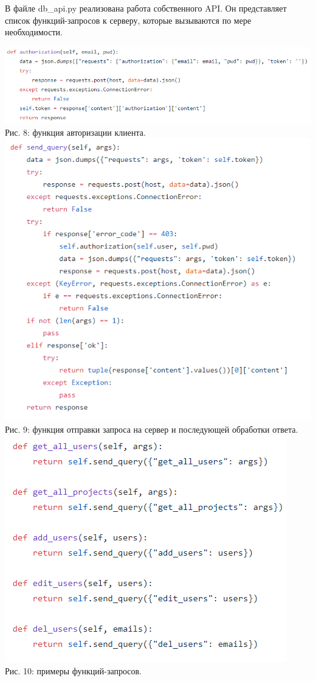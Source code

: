 \documentclass[14pt, a4paper]{extarticle}
\begin{document}
    В файле db\_api.py реализована работа собственного API. Он представляет список функций-запросов к серверу, которые вызываются по мере необходимости.
    \begin{center}
        \includegraphics[scale=0.7]{img/authorization_client.png}\\
        Рис. 8: функция авторизации клиента.\\[\baselineskip]
        \includegraphics[scale=0.6]{img/send_query.png}\\
        Рис. 9: функция отправки запроса на сервер и последующей обработки ответа.\\[\baselineskip]
        \includegraphics[scale=0.7]{img/other_func.png}\\
        Рис. 10: примеры функций-запросов.\\[\baselineskip]
    \end{center}
\end{document}
